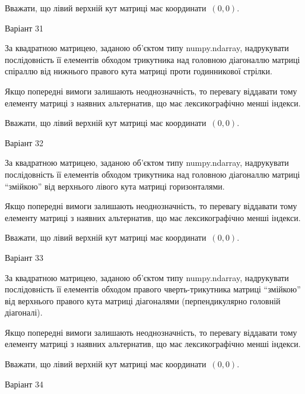 \documentclass[11pt]{article}
\begin{document}
Вважати, що лівий верхній кут матриці має координати~$(0,0)$.



{\Large \center  Варіант  31\par \bigskip\bigskip}

За квадратною матрицею, заданою об'єктом типу numpy.ndarray, надрукувати послідовність її елементів обходом трикутника над головною діагоналлю матриці спіраллю від нижнього правого кута матриці проти годинникової стрілки.

\vspace{2mm}
Якщо попередні вимоги залишають неоднозначність, то перевагу віддавати тому елементу матриці з наявних альтернатив, що має лексикографічно менші індекси.

Вважати, що лівий верхній кут матриці має координати~$(0,0)$.



{\Large \center  Варіант  32\par \bigskip\bigskip}

За квадратною матрицею, заданою об'єктом типу numpy.ndarray, надрукувати послідовність її елементів обходом трикутника над головною діагоналлю матриці ``змійкою'' від верхнього лівого кута матриці горизонталями.

\vspace{2mm}
Якщо попередні вимоги залишають неоднозначність, то перевагу віддавати тому елементу матриці з наявних альтернатив, що має лексикографічно менші індекси.

Вважати, що лівий верхній кут матриці має координати~$(0,0)$.



{\Large \center  Варіант  33\par \bigskip\bigskip}

За квадратною матрицею, заданою об'єктом типу numpy.ndarray, надрукувати послідовність її елементів обходом правого чверть-трикутника матриці ``змійкою'' від верхнього правого кута матриці діагоналями (перпендикулярно головній діагоналі).

\vspace{2mm}
Якщо попередні вимоги залишають неоднозначність, то перевагу віддавати тому елементу матриці з наявних альтернатив, що має лексикографічно менші індекси.

Вважати, що лівий верхній кут матриці має координати~$(0,0)$.



{\Large \center  Варіант  34\par \bigskip\bigskip}
\end{document}
